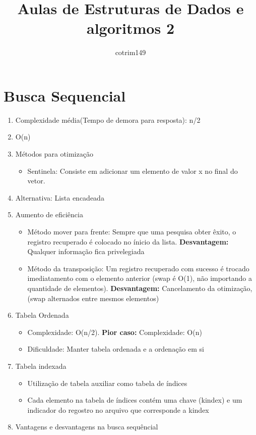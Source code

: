 \documentclass{article}
\title{Aulas de Estruturas de Dados e algoritmos 2}
\author{cotrim149}
\begin{document}
\maketitle

\section{Busca Sequencial}
	\begin{enumerate}
	\item Complexidade média(Tempo de demora para resposta): n/2
	\item O(n)
	\item Métodos para otimização
		\begin{itemize}
		\item Sentinela: Consiste em adicionar um elemento de valor x no final do vetor.
		\end{itemize}		 
	\item Alternativa: Lista encadeada
	\item Aumento de eficiência
		\begin{itemize}
		\item Método mover para frente: Sempre que uma pesquisa obter êxito, o registro recuperado é colocado no ínicio da lista. \textbf{Desvantagem:} Qualquer informação fica privelegiada
		\item Método da transposição: Um registro recuperado com sucesso é trocado imediatamento com o elemento anterior (swap é O(1), não importando a quantidade de elementos). \textbf{Desvantagem:} Cancelamento da otimização, (swap alternados entre mesmos elementos)		
		\end{itemize}
	\item Tabela Ordenada
		\begin{itemize}
		\item Complexidade: O(n/2). \textbf{Pior caso:} Complexidade: O(n)
		\item Dificuldade: Manter tabela ordenada e a ordenação em si
		\end{itemize}
	\item Tabela indexada
		\begin{itemize}
		\item Utilização de tabela auxiliar como tabela de índices
		\item Cada elemento na tabela de índices contém uma chave (kindex) e um indicador do regostro no arquivo que corresponde a kindex
		\end{itemize}
	\item Vantagens e desvantagens na busca sequêncial

\end{enumerate}
\end{document}
